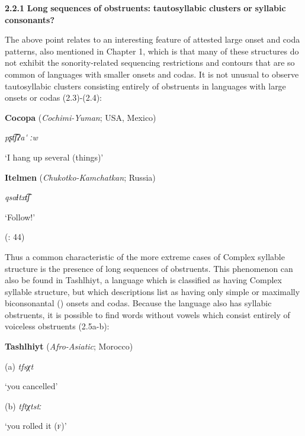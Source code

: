 \textbf{2.2.1} \textbf{Long} \textbf{sequences} \textbf{of} \textbf{obstruents:} \textbf{tautosyllabic} \textbf{clusters} \textbf{or} \textbf{syllabic} \textbf{consonants?}

  The above point relates to an interesting feature of attested large onset and coda patterns, also mentioned in Chapter 1, which is that many of these structures do not exhibit the sonority-related sequencing restrictions and contours that are so common of languages with smaller onsets and codas. It is not unusual to observe tautosyllabic clusters consisting entirely of obstruents in languages with large onsets or codas (2.3)-(2.4):

\ea\label{ex:(2.3)}
   \textbf{Cocopa} (\textit{Cochimi-Yuman}; USA, Mexico)

  \textit{pʂt͡ʃʔa\'{} ːw}

  ‘I hang up several (things)’

  \citep[36]{Crawford1966}

\z

\ea\label{ex:(2.4)}
   \textbf{Itelmen} (\textit{Chukotko-Kamchatkan}; Russia)

  \textit{qsaɬtxt͡ʃ}

  ‘Follow!’

  (\citealt{GeorgVolodin1999}: 44)

\z

  Thus a common characteristic of the more extreme cases of Complex syllable structure is the presence of long sequences of obstruents. This phenomenon can also be found in Tashlhiyt, a language which is classified as having Complex syllable structure, but which descriptions list as having only simple \citep{Ridouane2008} or maximally biconsonantal (\citealt{PuechLouali1999}) onsets and codas. Because the language also has syllabic obstruents, it is possible to find words without vowels which consist entirely of voiceless obstruents (2.5a-b):

\ea\label{ex:(2.5)}
   \textbf{Tashlhiyt} (\textit{Afro-Asiatic}; Morocco)

(a)  \textit{tfsχt}

‘you cancelled’

(b)  \textit{tftχtstː}

‘you rolled it (\textsc{f})’

  \citep[95]{Ridouane2002}
\z

